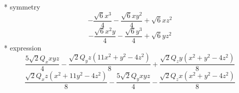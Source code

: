 \documentclass[fleqn,8pt]{jsarticle}
\begin{document}
\noindent\quad ** symmetry
\begin{dmath*}
- \frac{\sqrt{6} x^{3}}{4} - \frac{\sqrt{6} x y^{2}}{4} + \sqrt{6} x z^{2}
\end{dmath*}
\begin{dmath*}
- \frac{\sqrt{6} x^{2} y}{4} - \frac{\sqrt{6} y^{3}}{4} + \sqrt{6} y z^{2}
\end{dmath*}
\noindent\quad ** expression
\begin{dmath*}
\frac{5 \sqrt{2} Q_{x} x y z}{4} - \frac{\sqrt{2} Q_{y} z \left(11 x^{2} + y^{2} - 4 z^{2}\right)}{8} + \frac{\sqrt{2} Q_{z} y \left(x^{2} + y^{2} - 4 z^{2}\right)}{8}
\end{dmath*}
\begin{dmath*}
\frac{\sqrt{2} Q_{x} z \left(x^{2} + 11 y^{2} - 4 z^{2}\right)}{8} - \frac{5 \sqrt{2} Q_{y} x y z}{4} - \frac{\sqrt{2} Q_{z} x \left(x^{2} + y^{2} - 4 z^{2}\right)}{8}
\end{dmath*}
\end{document}
